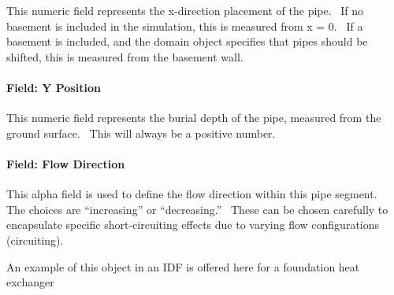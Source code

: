 This numeric field represents the x-direction placement of the pipe.~ If no basement is included in the simulation, this is measured from x = 0.~ If a basement is included, and the domain object specifies that pipes should be shifted, this is measured from the basement wall.

\paragraph{Field: Y Position}\label{field-y-position}

This numeric field represents the burial depth of the pipe, measured from the ground surface.~ This will always be a positive number.

\paragraph{Field: Flow Direction}\label{field-flow-direction}

This alpha field is used to define the flow direction within this pipe segment.~ The choices are ``increasing'' or ``decreasing.''~ These can be chosen carefully to encapsulate specific short-circuiting effects due to varying flow configurations (circuiting).

An example of this object in an IDF is offered here for a foundation heat exchanger


